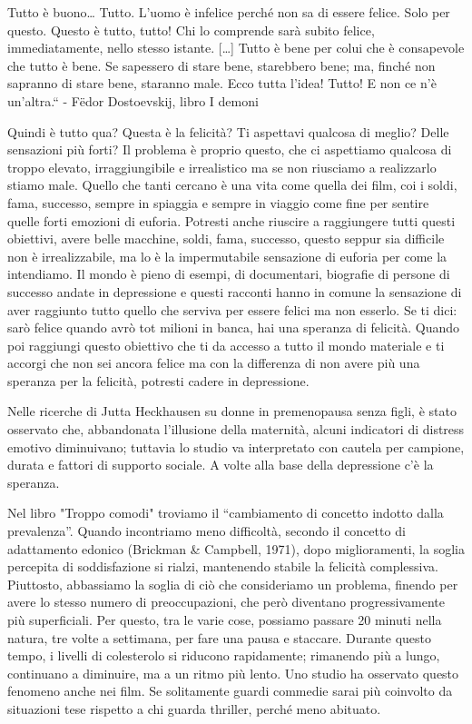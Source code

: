 \documentclass[12pt]{book} %
\begin{document}
Tutto è buono… Tutto. L'uomo è infelice perché non sa di essere felice. Solo per questo. Questo è tutto, tutto! Chi lo
comprende sarà subito felice, immediatamente, nello stesso istante. […] Tutto è bene per colui che è consapevole che
tutto è bene. Se sapessero di stare bene, starebbero bene; ma, finché non sapranno di stare bene, staranno male. Ecco
tutta l'idea! Tutto! E non ce n'è un'altra.“ - Fëdor Dostoevskij, libro I demoni

Quindi è tutto qua? Questa è la felicità? Ti aspettavi qualcosa di meglio? Delle sensazioni più forti? Il problema è
proprio questo, che ci aspettiamo qualcosa di troppo elevato, irraggiungibile e irrealistico ma se non riusciamo a
realizzarlo stiamo male. Quello che tanti cercano è una vita come quella dei film, coi i soldi, fama, successo,
sempre in spiaggia e sempre in viaggio come fine per sentire quelle forti emozioni di euforia. Potresti anche riuscire
a raggiungere tutti questi obiettivi, avere belle macchine, soldi, fama, successo, questo seppur sia difficile non è
irrealizzabile, ma lo è la impermutabile sensazione di euforia per come la intendiamo. Il mondo è pieno di esempi, di
documentari, biografie di persone di successo andate in depressione e questi racconti hanno in comune la
sensazione di aver raggiunto tutto quello che serviva per essere felici ma non esserlo. Se ti dici: sarò felice quando
avrò tot milioni in banca, hai una speranza di felicità. Quando poi raggiungi questo obiettivo che ti da accesso a
tutto il mondo materiale e ti accorgi che non sei ancora felice ma con la differenza di non avere più una speranza per
la felicità, potresti cadere in depressione.

Nelle ricerche di Jutta Heckhausen su donne in premenopausa senza figli, è stato osservato che, abbandonata l’illusione della maternità, alcuni indicatori di distress emotivo diminuivano; tuttavia lo studio va interpretato con cautela per campione, durata e fattori di supporto sociale. A volte alla base della depressione c'è la speranza. 

Nel libro "Troppo comodi" troviamo il “cambiamento di concetto indotto dalla prevalenza”. Quando incontriamo meno difficoltà, secondo il concetto di adattamento edonico (Brickman \& Campbell, 1971), dopo miglioramenti, la soglia percepita di soddisfazione si rialzi, mantenendo stabile la felicità complessiva. Piuttosto, abbassiamo la soglia di ciò che consideriamo un problema, finendo per avere lo stesso numero di preoccupazioni, che però diventano progressivamente più superficiali. Per questo, tra le varie cose, possiamo passare 20 minuti nella natura, tre volte a settimana, per fare una pausa e staccare. Durante questo tempo, i livelli di colesterolo si riducono rapidamente; rimanendo più a lungo, continuano a diminuire, ma a un ritmo più lento. Uno studio ha osservato questo fenomeno anche nei film. Se solitamente guardi commedie sarai più coinvolto da situazioni tese rispetto a chi guarda thriller, perché meno abituato.
\end{document}
